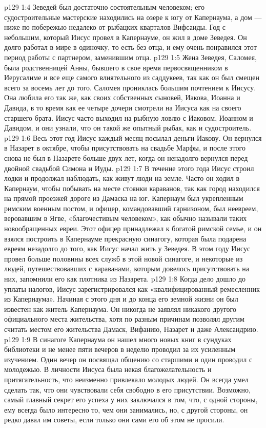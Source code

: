 \vs p129 1:4 Зеведей был достаточно состоятельным человеком; его судостроительные мастерские находились на озере к югу от Капернаума, а дом --- ниже по побережью недалеко от рыбацких кварталов Вифсаиды. Год с небольшим, который Иисус провел в Капернауме, он жил в доме Зеведея. Он долго работал в мире в одиночку, то есть без отца, и ему очень понравился этот период работы с партнером, заменившим отца.
\vs p129 1:5 Жена Зеведея, Саломея, была родственницей Анны, бывшего в свое время первосвященником в Иерусалиме и все еще самого влиятельного из саддукеев, так как он был смещен всего за восемь лет до того. Саломея прониклась большим почтением к Иисусу. Она любила его так же, как своих собственных сыновей, Иакова, Иоанна и Давида, в то время как ее четыре дочери смотрели на Иисуса как на своего старшего брата. Иисус часто выходил на рыбную ловлю с Иаковом, Иоанном и Давидом, и они узнали, что он такой же опытный рыбак, как и судостроитель.
\vs p129 1:6 \pc Весь этот год Иисус каждый месяц посылал деньги Иакову. Он вернулся в Назарет в октябре, чтобы присутствовать на свадьбе Марфы, и после этого снова не был в Назарете больше двух лет, когда он ненадолго вернулся перед двойной свадьбой Симона и Иуды.
\vs p129 1:7 \pc В течение этого года Иисус строил лодки и продолжал наблюдать, как живут люди на земле. Часто он ходил в Капернаум, чтобы побывать на месте стоянки караванов, так как город находился на прямой проезжей дороге из Дамаска на юг. Капернаум был укрепленным римским военным постом, и офицер, командовавший гарнизоном, был неевреем, веровавшим в Ягве, «благочестивым человеком», как обычно называли таких новообращенных евреи. Этот офицер принадлежал к богатой римской семье, и он взялся построить в Капернауме прекрасную синагогу, которая была подарена евреям незадолго до того, как Иисус начал жить у Зеведея. В этом году Иисус провел больше половины всех служб в этой новой синагоге, и некоторые из людей, путешествовавших с караванами, которым довелось присутствовать на них, запомнили его как плотника из Назарета.
\vs p129 1:8 Когда дело дошло до уплаты налогов, Иисус зарегистрировался как «квалифицированный ремесленник из Капернаума». Начиная с этого дня и до конца его земной жизни он был известен как житель Капернаума. Он никогда не заявлял никакого другого официального места жительства, хотя по разным причинам позволял другим считать местом его жительства Дамаск, Вифанию, Назарет и даже Александрию.
\vs p129 1:9 В синагоге Капернаума он нашел много новых книг в сундуках библиотеки и не менее пяти вечеров в неделю проводил за их усиленным изучением. Один вечер он посвящал общению со старшими и один проводил с молодежью. В личности Иисуса была некая благожелательность и притягательность, что неизменно привлекало молодых людей. Он всегда умел сделать так, что они чувствовали себя свободно в его присутствии. Возможно, самый главный секрет его успеха у них заключался в том, что, с одной стороны, ему всегда было интересно то, чем они занимались, но, с другой стороны, он редко давал им советы, если только они сами его об этом не просили.
